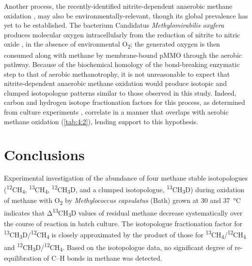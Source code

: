Another process, the recently-identified nitrite-dependent anaerobic
methane oxidation \parencite{Ettwig++_2010_N}, may also be
environmentally-relevant, though its global prevalence has yet to be
established. The bacterium Candidatus \emph{Methylomirabilis oxyfera}
produces molecular oxygen intracellularly from the reduction of nitrite
to nitric oxide \parencite{Ettwig++_2010_N}, in the absence of environmental
O\textsubscript{2}; the generated oxygen is then consumed along with
methane by membrane-bound pMMO through the aerobic pathway. Because of
the biochemical homology of the bond-breaking enzymatic step to that of
aerobic methanotrophy, it is not unreasonable to expect that
nitrite-dependent anaerobic methane oxidation would produce isotopic and
clumped isotopologue patterns similar to those observed in this study.
Indeed, carbon and hydrogen isotope fractionation factors for this
process, as determined from culture experiments \parencite{Rasigraf++_2012_GCA},
correlate in a manner that overlaps with aerobic methane oxidation
(\autoref{tab:4:2}), lending support to this hypothesis.

\section{Conclusions}\label{sec:4:conclusions}

Experimental investigation of the abundance of four methane stable
isotopologues (\textsuperscript{12}CH\textsubscript{4},
\textsuperscript{13}CH\textsubscript{4},
\textsuperscript{12}CH\textsubscript{3}D, and a clumped isotopologue,
\textsuperscript{13}CH\textsubscript{3}D) during oxidation of methane
with O\textsubscript{2} by \emph{Methylococcus capsulatus} (Bath) grown
at 30 and 37~°C indicates that Δ\textsuperscript{13}CH\textsubscript{3}D
values of residual methane decrease systematically over the course of
reaction in batch culture. The isotopologue fractionation factor for
\textsuperscript{13}CH\textsubscript{3}D/\textsuperscript{12}CH\textsubscript{4}
is closely approximated by the product of those for
\textsuperscript{13}CH\textsubscript{4}/\textsuperscript{12}CH\textsubscript{4}
and
\textsuperscript{12}CH\textsubscript{3}D/\textsuperscript{12}CH\textsubscript{4}.
Based on the isotopologue data, no significant degree of
re-equilibration of C--H bonds in methane was detected.

